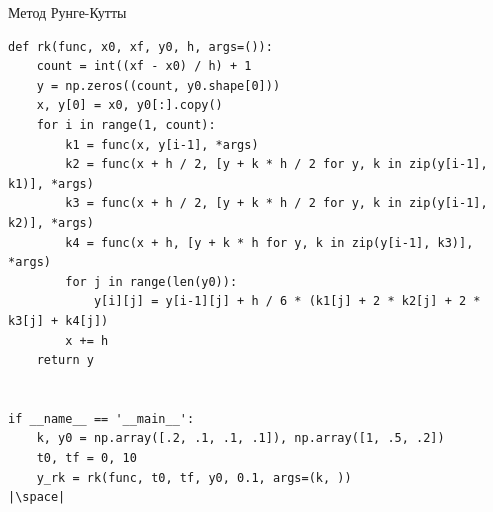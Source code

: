 \documentclass[aspectratio=169, mathserif]{beamer}	%
\begin{document}
\begin{frame}[fragile, label=c]{Метод Рунге-Кутты}
\scriptsize
\begin{verbatim}
def rk(func, x0, xf, y0, h, args=()):
    count = int((xf - x0) / h) + 1
    y = np.zeros((count, y0.shape[0]))
    x, y[0] = x0, y0[:].copy()
    for i in range(1, count):
        k1 = func(x, y[i-1], *args)
        k2 = func(x + h / 2, [y + k * h / 2 for y, k in zip(y[i-1], k1)], *args)
        k3 = func(x + h / 2, [y + k * h / 2 for y, k in zip(y[i-1], k2)], *args)
        k4 = func(x + h, [y + k * h for y, k in zip(y[i-1], k3)], *args)
        for j in range(len(y0)):
            y[i][j] = y[i-1][j] + h / 6 * (k1[j] + 2 * k2[j] + 2 * k3[j] + k4[j])
        x += h
    return y


if __name__ == '__main__':
    k, y0 = np.array([.2, .1, .1, .1]), np.array([1, .5, .2])
    t0, tf = 0, 10
    y_rk = rk(func, t0, tf, y0, 0.1, args=(k, ))
|\space|
\end{verbatim}
\vfill
\end{frame}



\end{document}
